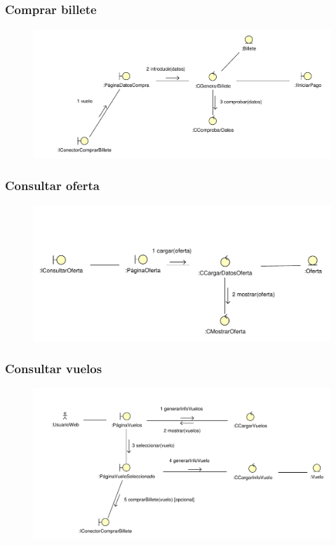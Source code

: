 \documentclass[11pt, a4paper, twoside, titlepage]{article}
\begin{document}
			\subsubsection{Comprar billete}
				\begin{figure}[H]\centering
					\includegraphics[scale=.72]{diagramas/comprarbillete.pdf}
				\end{figure}

			\subsubsection{Consultar oferta}
				\begin{figure}[H]\centering
					\includegraphics[scale=.85]{diagramas/consultaroferta.pdf}
				\end{figure}

			\subsubsection{Consultar vuelos}
				\begin{figure}[H]\centering
					\includegraphics[scale=.71]{diagramas/consultarvuelos.pdf}
				\end{figure}
			
\end{document}
